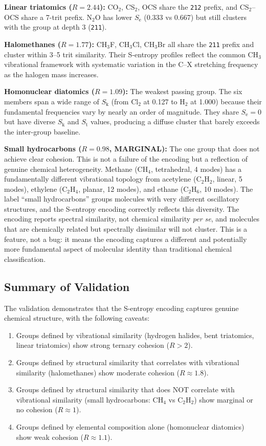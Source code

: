 \documentclass[11pt,twocolumn,a4paper]{article}
\theoremstyle{definition}
\theoremstyle{remark}
\newcommand{\Sk}{S_{\mathrm{k}}}
\newcommand{\St}{S_{\mathrm{t}}}
\newcommand{\Se}{S_{\mathrm{e}}}
\begin{document}
\textbf{Linear triatomics ($R = 2.44$):} CO$_2$, CS$_2$, OCS share the \texttt{212} prefix, and CS$_2$--OCS share a 7-trit prefix. N$_2$O has lower $\Se$ (0.333 vs 0.667) but still clusters with the group at depth 3 (\texttt{211}).

\textbf{Halomethanes ($R = 1.77$):} CH$_3$F, CH$_3$Cl, CH$_3$Br all share the \texttt{211} prefix and cluster within 3--5 trit similarity. Their S-entropy profiles reflect the common CH$_3$ vibrational framework with systematic variation in the C--X stretching frequency as the halogen mass increases.

\textbf{Homonuclear diatomics ($R = 1.09$):} The weakest passing group. The six members span a wide range of $\Sk$ (from Cl$_2$ at 0.127 to H$_2$ at 1.000) because their fundamental frequencies vary by nearly an order of magnitude. They share $\Se = 0$ but have diverse $\Sk$ and $\St$ values, producing a diffuse cluster that barely exceeds the inter-group baseline.

\textbf{Small hydrocarbons ($R = 0.98$, MARGINAL):} The one group that does not achieve clear cohesion. This is not a failure of the encoding but a reflection of genuine chemical heterogeneity. Methane (CH$_4$, tetrahedral, 4 modes) has a fundamentally different vibrational topology from acetylene (C$_2$H$_2$, linear, 5 modes), ethylene (C$_2$H$_4$, planar, 12 modes), and ethane (C$_2$H$_6$, 10 modes). The label ``small hydrocarbons'' groups molecules with very different oscillatory structures, and the S-entropy encoding correctly reflects this diversity. The encoding reports spectral similarity, not chemical similarity \emph{per se}, and molecules that are chemically related but spectrally dissimilar will not cluster. This is a feature, not a bug: it means the encoding captures a different and potentially more fundamental aspect of molecular identity than traditional chemical classification.

\subsection{Summary of Validation}

The validation demonstrates that the S-entropy encoding captures genuine chemical structure, with the following caveats:

\begin{enumerate}[nosep]
\item Groups defined by vibrational similarity (hydrogen halides, bent triatomics, linear triatomics) show strong ternary cohesion ($R > 2$).
\item Groups defined by structural similarity that correlates with vibrational similarity (halomethanes) show moderate cohesion ($R \approx 1.8$).
\item Groups defined by structural similarity that does NOT correlate with vibrational similarity (small hydrocarbons: CH$_4$ vs C$_2$H$_2$) show marginal or no cohesion ($R \approx 1$).
\item Groups defined by elemental composition alone (homonuclear diatomics) show weak cohesion ($R \approx 1.1$).
\end{enumerate}
\end{document}
